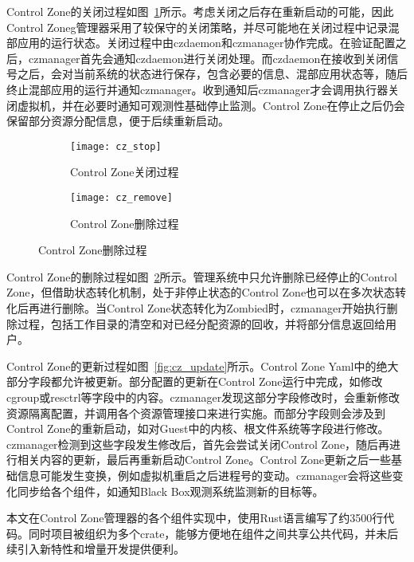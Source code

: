 Control Zone的关闭过程如图~\ref{fig:cz_stop}所示。考虑关闭之后存在重新启动的可能，因此Control Zoneg管理器采用了较保守的关闭策略，并尽可能地在关闭过程中记录混部应用的运行状态。关闭过程中由czdaemon和czmanager协作完成。在验证配置之后，czmanager首先会通知czdaemon进行关闭处理。而czdaemon在接收到关闭信号之后，会对当前系统的状态进行保存，包含必要的信息、混部应用状态等，随后终止混部应用的运行并通知czmanager。收到通知后czmanager才会调用执行器关闭虚拟机，并在必要时通知可观测性基础停止监测。Control Zone在停止之后仍会保留部分资源分配信息，便于后续重新启动。

\begin{figure}[H]
    \centering
    \begin{subfigure}[b]{0.46\textwidth}
        \texttt{[image: cz\_stop]}
        \caption{\quad Control Zone关闭过程}
        \label{fig:cz_stop}
    \end{subfigure}
    \hfill
    \begin{subfigure}[b]{0.53\textwidth}
        \texttt{[image: cz\_remove]}
        \caption{\quad Control Zone删除过程}
        \label{fig:cz_remove}
    \end{subfigure}
\label{fig:cz_stop_delete}
\end{figure}

Control Zone的删除过程如图~\ref{fig:cz_remove}所示。管理系统中只允许删除已经停止的Control Zone，但借助状态转化机制，处于非停止状态的Control Zone也可以在多次状态转化后再进行删除。当Control Zone状态转化为Zombied时，czmanager开始执行删除过程，包括工作目录的清空和对已经分配资源的回收，并将部分信息返回给用户。

Control Zone的更新过程如图~\ref{fig:cz_update}所示。Control Zone Yaml中的绝大部分字段都允许被更新。部分配置的更新在Control Zone运行中完成，如修改cgroup或resctrl等字段中的内容。czmanager发现这部分字段修改时，会重新修改资源隔离配置，并调用各个资源管理接口来进行实施。而部分字段则会涉及到Control Zone的重新启动，如对Guest中的内核、根文件系统等字段进行修改。czmanager检测到这些字段发生修改后，首先会尝试关闭Control Zone，随后再进行相关内容的更新，最后再重新启动Control Zone。Control Zone更新之后一些基础信息可能发生变换，例如虚拟机重启之后进程号的变动。czmanager会将这些变化同步给各个组件，如通知Black Box观测系统监测新的目标等。

本文在Control Zone管理器的各个组件实现中，使用Rust语言编写了约3500行代码。同时项目被组织为多个crate，能够方便地在组件之间共享公共代码，并未后续引入新特性和增量开发提供便利。

